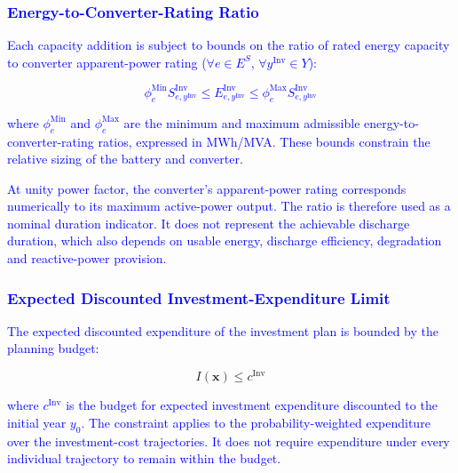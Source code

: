 \documentclass[preprint,12pt]{elsarticle}
\begin{document}
\subsubsection{\textcolor{blue}{Energy-to-Converter-Rating Ratio}}

\textcolor{blue}{
    Each capacity addition is subject to bounds on the ratio of rated energy capacity to converter apparent-power rating ($\forall e\in E^S$, $\forall y^{\text{Inv}}\in Y$):
}

\textcolor{blue}{
    \begin{equation}
        \phi^{\text{Min}}_e S^{\text{Inv}}_{e,y^{\text{Inv}}} \leq 
        E^{\text{Inv}}_{e,y^{\text{Inv}}} \leq 
        \phi^{\text{Max}}_e S^{\text{Inv}}_{e,y^{\text{Inv}}}
        \label{eq:master_duration}
    \end{equation}
}

\noindent
\textcolor{blue}{
    where $\phi^{\text{Min}}_e$ and $\phi^{\text{Max}}_e$ are the minimum and maximum admissible energy-to-converter-rating ratios, expressed in MWh/MVA. These bounds constrain the relative sizing of the battery and converter.
}

\textcolor{blue}{
    At unity power factor, the converter's apparent-power rating corresponds numerically to its maximum active-power output. The ratio is therefore used as a nominal duration indicator. It does not represent the achievable discharge duration, which also depends on usable energy, discharge efficiency, degradation and reactive-power provision.
}

\subsubsection{\textcolor{blue}{Expected Discounted Investment-Expenditure Limit}}

\textcolor{blue}{
    The expected discounted expenditure of the investment plan is bounded by the planning budget:
}

\begin{equation}
    I(\boldsymbol{x}) \leq c^{\text{Inv}}
    \label{eq:master_budget}
\end{equation}

\noindent
\textcolor{blue}{
    where 
    $c^{\text{Inv}}$ is the budget for expected investment expenditure discounted to the initial year $y_0$.
    The constraint applies to the probability-weighted expenditure over the investment-cost trajectories. It does not require expenditure under every individual trajectory to remain within the budget.
}
\end{document}
